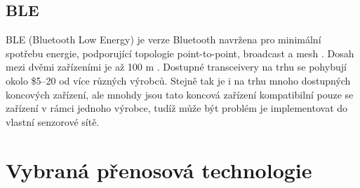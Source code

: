 \subsection{BLE}
BLE (Bluetooth Low Energy) je verze Bluetooth navržena pro minimální spotřebu energie, podporující topologie point-to-point, broadcast a mesh \cite{BT_alliance}.
Dosah mezi dvěmi zařízeními je až 100 m \cite{BT_nordic}.
Dostupné transceivery na trhu se pohybují okolo \$5–20 od více různých výrobců. Stejně tak je i na trhu mnoho dostupných koncových zařízení, ale mnohdy jsou tato koncová zařízení kompatibilní pouze se zařízení v rámci jednoho výrobce, tudíž může být problém je implementovat do vlastní senzorové sítě. 






\newpage

\section{Vybraná přenosová technologie}

